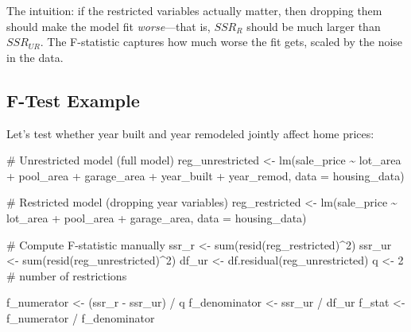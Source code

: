 \documentclass[
  letterpaper,
  DIV=11,
  numbers=noendperiod]{scrreprt}
\newenvironment{Shaded}{\begin{snugshade}}{\end{snugshade}}
\newcommand{\AttributeTok}[1]{\textcolor[rgb]{0.40,0.45,0.13}{#1}}
\newcommand{\CommentTok}[1]{\textcolor[rgb]{0.37,0.37,0.37}{#1}}
\newcommand{\DecValTok}[1]{\textcolor[rgb]{0.68,0.00,0.00}{#1}}
\newcommand{\FunctionTok}[1]{\textcolor[rgb]{0.28,0.35,0.67}{#1}}
\newcommand{\NormalTok}[1]{\textcolor[rgb]{0.00,0.23,0.31}{#1}}
\newcommand{\OtherTok}[1]{\textcolor[rgb]{0.00,0.23,0.31}{#1}}
\newcommand{\SpecialCharTok}[1]{\textcolor[rgb]{0.37,0.37,0.37}{#1}}
\begin{document}
The intuition: if the restricted variables actually matter, then
dropping them should make the model fit \emph{worse}---that is,
\(SSR_R\) should be much larger than \(SSR_{UR}\). The F-statistic
captures how much worse the fit gets, scaled by the noise in the data.

\subsection{F-Test Example}\label{f-test-example}

Let's test whether year built and year remodeled jointly affect home
prices:

\begin{Shaded}
\begin{Highlighting}[]
\CommentTok{\# Unrestricted model (full model)}
\NormalTok{reg\_unrestricted }\OtherTok{\textless{}{-}} \FunctionTok{lm}\NormalTok{(sale\_price }\SpecialCharTok{\textasciitilde{}}\NormalTok{ lot\_area }\SpecialCharTok{+}\NormalTok{ pool\_area }\SpecialCharTok{+}\NormalTok{ garage\_area }\SpecialCharTok{+}
\NormalTok{                         year\_built }\SpecialCharTok{+}\NormalTok{ year\_remod,}
                       \AttributeTok{data =}\NormalTok{ housing\_data)}

\CommentTok{\# Restricted model (dropping year variables)}
\NormalTok{reg\_restricted }\OtherTok{\textless{}{-}} \FunctionTok{lm}\NormalTok{(sale\_price }\SpecialCharTok{\textasciitilde{}}\NormalTok{ lot\_area }\SpecialCharTok{+}\NormalTok{ pool\_area }\SpecialCharTok{+}\NormalTok{ garage\_area,}
                     \AttributeTok{data =}\NormalTok{ housing\_data)}

\CommentTok{\# Compute F{-}statistic manually}
\NormalTok{ssr\_r }\OtherTok{\textless{}{-}} \FunctionTok{sum}\NormalTok{(}\FunctionTok{resid}\NormalTok{(reg\_restricted)}\SpecialCharTok{\^{}}\DecValTok{2}\NormalTok{)}
\NormalTok{ssr\_ur }\OtherTok{\textless{}{-}} \FunctionTok{sum}\NormalTok{(}\FunctionTok{resid}\NormalTok{(reg\_unrestricted)}\SpecialCharTok{\^{}}\DecValTok{2}\NormalTok{)}
\NormalTok{df\_ur }\OtherTok{\textless{}{-}} \FunctionTok{df.residual}\NormalTok{(reg\_unrestricted)}
\NormalTok{q }\OtherTok{\textless{}{-}} \DecValTok{2}  \CommentTok{\# number of restrictions}

\NormalTok{f\_numerator }\OtherTok{\textless{}{-}}\NormalTok{ (ssr\_r }\SpecialCharTok{{-}}\NormalTok{ ssr\_ur) }\SpecialCharTok{/}\NormalTok{ q}
\NormalTok{f\_denominator }\OtherTok{\textless{}{-}}\NormalTok{ ssr\_ur }\SpecialCharTok{/}\NormalTok{ df\_ur}
\NormalTok{f\_stat }\OtherTok{\textless{}{-}}\NormalTok{ f\_numerator }\SpecialCharTok{/}\NormalTok{ f\_denominator}


\end{Highlighting}
\end{Shaded}
\end{document}
